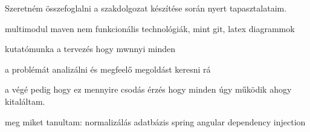 Szeretném összefoglalni a szakdolgozat készítése során nyert tapasztalataim.

multimodul maven
nem funkcionális technológiák, mint git, latex diagrammok 


kutatómunka a tervezés hogy mwnnyi minden

a problémát analizálni és megfeelő megoldást keresni rá

a végé pedig hogy ez mennyire csodás érzés hogy minden úgy működik ahogy kitaláltam.


meg miket tanultam:
normalizálás adatbázis
spring  angular
dependency injection